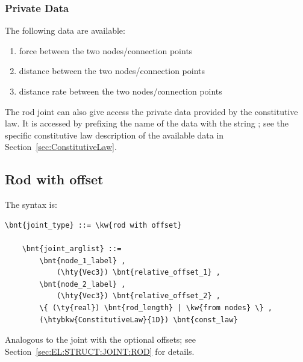 \subsubsection{Private Data}
The following data are available:
\begin{enumerate}
\item {} force between the two nodes/connection points
\item {} distance between the two nodes/connection points
\item {} distance rate between the two nodes/connection points
\end{enumerate}
The rod joint can also give access the private data provided 
by the constitutive law.
It is accessed by prefixing the name of the data with the string
; see the specific constitutive law
description of the available data in Section~\ref{sec:ConstitutiveLaw}.





\subsection{Rod with offset}
\label{sec:EL:STRUCT:JOINT:ROD_WITH_OFFSET}
The syntax is:
\begin{Verbatim}[commandchars=\\\{\}]
    \bnt{joint_type} ::= \kw{rod with offset}

    \bnt{joint_arglist} ::=
        \bnt{node_1_label} ,
            (\hty{Vec3}) \bnt{relative_offset_1} ,
        \bnt{node_2_label} ,
            (\hty{Vec3}) \bnt{relative_offset_2} ,
        \{ (\ty{real}) \bnt{rod_length} | \kw{from nodes} \} ,
        (\htybkw{ConstitutiveLaw}{1D}) \bnt{const_law}
\end{Verbatim}
Analogous to the  joint with the optional offsets;
see Section~\ref{sec:EL:STRUCT:JOINT:ROD} for details.

